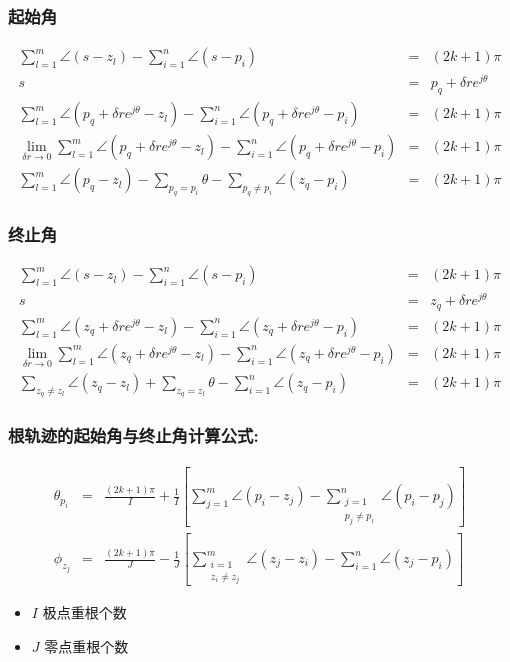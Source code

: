 \documentclass{article}
\begin{document}
\begin{frame}
\frametitle{起始角}
\label{sec-2-1-8}

\begin{eqnarray*}
\sum_{l=1}^{m}\angle(s-z_{l})-\sum_{i=1}^{n}\angle(s-p_{i}) & = & (2k+1)\pi\\
s & = & p_{q}+\delta re^{j\theta}\\
\sum_{l=1}^{m}\angle(p_{q}+\delta re^{j\theta}-z_{l})-\sum_{i=1}^{n}\angle(p_{q}+\delta re^{j\theta}-p_{i}) & = & (2k+1)\pi\\
\lim_{\delta r\rightarrow0}\sum_{l=1}^{m}\angle(p_{q}+\delta re^{j\theta}-z_{l})-\sum_{i=1}^{n}\angle(p_{q}+\delta re^{j\theta}-p_{i}) & = & (2k+1)\pi\\
\sum_{l=1}^{m}\angle(p_{q}-z_{l})-\sum_{p_{q}=p_{i}}\theta-\sum_{p_{q}\not=p_{i}}\angle(z_{q}-p_{i}) & = & (2k+1)\pi
\end{eqnarray*}
\end{frame}
\begin{frame}
\frametitle{终止角}
\label{sec-2-1-9}

\begin{eqnarray*}
\sum_{l=1}^{m}\angle(s-z_{l})-\sum_{i=1}^{n}\angle(s-p_{i}) & = & (2k+1)\pi\\
s & = & z_{q}+\delta re^{j\theta}\\
\sum_{l=1}^{m}\angle(z_{q}+\delta re^{j\theta}-z_{l})-\sum_{i=1}^{n}\angle(z_{q}+\delta re^{j\theta}-p_{i}) & = & (2k+1)\pi\\
\lim_{\delta r\rightarrow0}\sum_{l=1}^{m}\angle(z_{q}+\delta re^{j\theta}-z_{l})-\sum_{i=1}^{n}\angle(z_{q}+\delta re^{j\theta}-p_{i}) & = & (2k+1)\pi\\
\sum_{z_{q}\not=z_{l}}\angle(z_{q}-z_{l})+\sum_{z_{q}=z_{l}}\theta-\sum_{i=1}^{n}\angle(z_{q}-p_{i}) & = & (2k+1)\pi
\end{eqnarray*}
\end{frame}
\begin{frame}
\frametitle{根轨迹的起始角与终止角计算公式:}
\label{sec-2-1-10}

   
\begin{eqnarray*}
\theta_{p_i} & = & \frac{(2k+1)\pi}{I}+\frac{1}{I}\left[\sum_{j=1}^m\angle(p_i-z_j)-\sum_{\substack{j=1 \\ p_j\neq p_i}}^n\angle(p_i-p_j)\right] \\
\phi_{z_j} & = & \frac{(2k+1)\pi}{J}-\frac{1}{J}\left[\sum_{\substack{i=1 \\ z_i\neq z_j}}^m\angle(z_j-z_i)-\sum_{i=1}^n\angle(z_j-p_i)\right] 
\end{eqnarray*}
\begin{itemize}
\item $I$ 极点重根个数
\item $J$ 零点重根个数
\end{itemize}
\end{frame}
\end{document}
